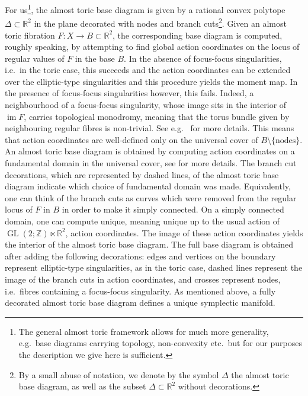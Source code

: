 \documentclass[AIF,Unicode,manuscript]{cedram}
\DeclareMathOperator{\im}{im}
\begin{document}
For us\footnote{The general almost toric framework allows for much more generality, e.g.\ base diagrams carrying topology, non-convexity etc.\, but for our purposes the description we give here is sufficient.}, the almost toric base diagram is given by a rational convex polytope $\Delta \subset \mathbb{R}^2$ in the plane decorated with nodes and branch cuts\footnote{By a small abuse of notation, we denote by the symbol $\Delta$ the almost toric base diagram, as well as the subset $\Delta \subset \mathbb{R}^2$ without decorations.}.
Given an almost toric fibration $F \colon X \rightarrow B \subset \mathbb{R}^2$, the corresponding base diagram is computed, roughly speaking, by attempting to find global action coordinates on the locus of regular values of $F$ in the base $B$.
In the absence of focus-focus singularities, i.e.\ in the toric case, this succeeds and the action coordinates can be extended over the elliptic-type singularities and this procedure yields the moment map.
In the presence of focus-focus singularities however, this fails.
Indeed, a neighbourhood of a focus-focus singularity, whose image sits in the interior of $\im F$, carries topological monodromy, meaning that the torus bundle given by neighbouring regular fibres is non-trivial.
See e.g.\ \cite{Zun97} for more details.
This means that action coordinates are well-defined only on the universal cover of $B \setminus \{\text{nodes}\}$.
An almost toric base diagram is obtained by computing action coordinates on a fundamental domain in the universal cover, see \cite[Definition 8.3]{evans2021atfs} for more details.
The branch cut decorations, which are represented by dashed lines, of the almost toric base diagram indicate which choice of fundamental domain was made.
Equivalently, one can think of the branch cuts as curves which were removed from the regular locus of $F$ in $B$ in order to make it simply connected.
On a simply connected domain, one can compute unique, meaning unique up to the usual action of $\operatorname{GL}(2;\mathbb{Z}) \ltimes \mathbb{R}^2$, action coordinates.
The image of these action coordinates yields the interior of the almost toric base diagram.
The full base diagram is obtained after adding the following decorations: edges and vertices on the boundary represent elliptic-type singularities, as in the toric case, dashed lines represent the image of the branch cuts in action coordinates, and crosses represent nodes, i.e.\ fibres containing a focus-focus singularity.
As mentioned above, a fully decorated almost toric base diagram defines a unique symplectic manifold.
\end{document}

